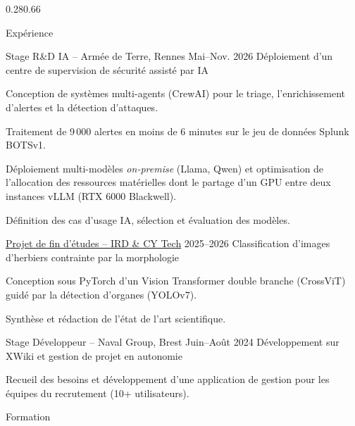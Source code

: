 \documentclass[a4paper]{resume} %
\begin{document}
\begin{rColumns}{0.28}{0.66}
\begin{rSection}{Expérience}
  \begin{rSubsection}{Stage R\&D IA -- Armée de Terre, Rennes}
                     {Mai--Nov. 2026}
                     {Déploiement d'un centre de supervision de sécurité assisté par IA}
    \item Conception de systèmes multi-agents (CrewAI) pour le triage,
          l'enrichissement d'alertes et la détection d'attaques.
    \item Traitement de 9\,000 alertes en moins de 6 minutes sur le jeu de
          données Splunk BOTSv1.  
    \item Déploiement multi-modèles \textit{on-premise} (Llama, Qwen) et optimisation de
          l'allocation des ressources matérielles dont le partage d'un GPU
          entre deux instances vLLM (RTX 6000 Blackwell).
    \item Définition des cas d'usage IA, sélection et évaluation des modèles.
  \end{rSubsection}

  \begin{rSubsection}{\href{https://github.com/Victand/pfe_crossvit_dual}{Projet de fin d'études -- IRD \& CY Tech}}
                     {2025--2026}
                     {Classification d'images d'herbiers contrainte par la morphologie}
    \item Conception sous PyTorch d'un Vision Transformer double branche
          (CrossViT) guidé par la détection d'organes (YOLOv7).
    \item Synthèse et rédaction de l'état de l'art scientifique.
  \end{rSubsection}

  \begin{rSubsection}{Stage Développeur -- Naval Group, Brest}
                     {Juin--Août 2024}
                     {Développement sur XWiki et gestion de projet en autonomie}
    \item Recueil des besoins et développement d'une application de gestion
          pour les équipes du recrutement (10+ utilisateurs).
  \end{rSubsection}

\end{rSection}

\begin{rSection}{Formation}


\end{rSection}
\end{rColumns}
\end{document}
